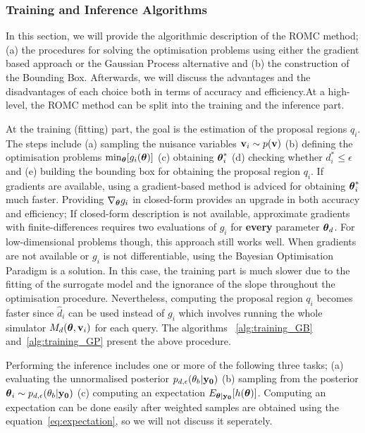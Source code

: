 \subsubsection{Training and Inference Algorithms}
\label{subsubsec:alg-training-inference}

In this section, we will provide the algorithmic description of the
ROMC method; (a) the procedures for solving the optimisation problems
using either the gradient based approach or the Gaussian Process
alternative and (b) the construction of the Bounding Box. Afterwards,
we will discuss the advantages and the disadvantages of each choice
both in terms of accuracy and efficiency.At a high-level, the ROMC
method can be split into the training and the inference part.

\noindent
At the training (fitting) part, the goal is the estimation of the
proposal regions $q_i$. The steps include (a) sampling the nuisance
variables $\mathbf{v}_i \sim p(\mathbf{v})$ (b) defining the optimisation problems
$\min_{\boldsymbol{\theta}} [g_i(\boldsymbol{\theta})]$ (c) obtaining $\boldsymbol{\theta}_i^*$ (d)
checking whether $d_i^* \leq \epsilon$ and (e) building the bounding
box for obtaining the proposal region $q_i$. If gradients are
available, using a gradient-based method is adviced for obtaining
$\boldsymbol{\theta}_i^*$ much faster.  Providing $\nabla_{\boldsymbol{\theta}} g_i$ in
closed-form provides an upgrade in both accuracy and efficiency; If
closed-form description is not available, approximate gradients with
finite-differences requires two evaluations of $g_i$ for
\textbf{every} parameter $\boldsymbol{\theta}_d$. For low-dimensional problems
though, this approach still works well. When gradients are not
available or $g_i$ is not differentiable, using the Bayesian
Optimisation Paradigm is a solution. In this case, the training part
is much slower due to the fitting of the surrogate model and the
ignorance of the slope throughout the optimisation
procedure. Nevertheless, computing the proposal region $q_i$ becomes
faster since $\hat{d}_i$ can be used instead of $g_i$ which involves
running the whole simulator $M_d(\boldsymbol{\theta}, \mathbf{v}_i)$ for each query. The
algorithms ~\ref{alg:training_GB} and~\ref{alg:training_GP} present
the above procedure.

\noindent
Performing the inference includes one or more of the following three
tasks; (a) evaluating the unnormalised posterior
$p_{d, \epsilon}(\theta_b|\mathbf{y_0})$ (b) sampling from the posterior
$ \boldsymbol{\theta}_i \sim p_{d, \epsilon}(\theta_b|\mathbf{y_0})$ (c) computing an
expectation $E_{\boldsymbol{\theta}|\mathbf{y_0}}[h(\boldsymbol{\theta})]$. Computing an expectation
can be done easily after weighted samples are obtained using the
equation~\ref{eq:expectation}, so we will not discuss it seperately.

